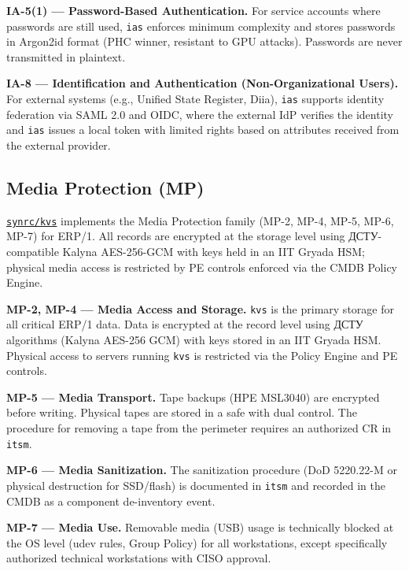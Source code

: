 \documentclass{article}
\begin{document}
\textbf{IA-5(1) --- Password-Based Authentication.}
For service accounts where passwords are still used, \texttt{ias} enforces minimum complexity and stores passwords in Argon2id format (PHC winner, resistant to GPU attacks). Passwords are never transmitted in plaintext.

\textbf{IA-8 --- Identification and Authentication (Non-Organizational Users).}
For external systems (e.g., Unified State Register, Diia), \texttt{ias} supports identity federation via SAML 2.0 and OIDC, where the external IdP verifies the identity and \texttt{ias} issues a local token with limited rights based on attributes received from the external provider.

\subsection{Media Protection (MP)}

\href{https://github.com/synrc/kvs}{\texttt{synrc/kvs}} implements the Media Protection family (MP-2, MP-4, MP-5, MP-6, MP-7) for ERP/1. All records are encrypted at the storage level using \foreignlanguage{ukrainian}{ДСТУ}-compatible Kalyna AES-256-GCM with keys held in an IIT Gryada HSM; physical media access is restricted by PE controls enforced via the CMDB Policy Engine.

\textbf{MP-2, MP-4 --- Media Access and Storage.}
\texttt{kvs} is the primary storage for all critical ERP/1 data. Data is encrypted at the record level using \foreignlanguage{ukrainian}{\foreignlanguage{ukrainian}{ДСТУ} algorithms} (Kalyna AES-256 GCM) with keys stored in an IIT Gryada HSM. Physical access to servers running \texttt{kvs} is restricted via the Policy Engine and PE controls.

\textbf{MP-5 --- Media Transport.}
Tape backups (HPE MSL3040) are encrypted before writing. Physical tapes are stored in a safe with dual control. The procedure for removing a tape from the perimeter requires an authorized CR in \texttt{itsm}.

\textbf{MP-6 --- Media Sanitization.}
The sanitization procedure (DoD 5220.22-M or physical destruction for SSD/flash) is documented in \texttt{itsm} and recorded in the CMDB as a component de-inventory event.

\textbf{MP-7 --- Media Use.}
Removable media (USB) usage is technically blocked at the OS level (udev rules, Group Policy) for all workstations, except specifically authorized technical workstations with CISO approval.
\end{document}

